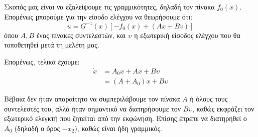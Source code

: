 \documentclass[11pt,a4paper,notitlepage,fleqn]{article}
\begin{document}
\begin{exercise}
	Σκοπός μας είναι να εξαλείψουμε τις γραμμικότητες, δηλαδή τον πίνακα
	\( f_0(x) \). Επομένως μπορούμε για την είσοδο ελέγχου να θεωρήσουμε
	ότι:
	\[
	u = G^{-1}(x)\left[
	-f_0(x) + (Ax+Bv)
	\right]
	\]
	όπου \( A,B \) ένας πίνακες συντελεστών, και \( \upsilon \) η
	εξωτερική είσοδος ελέγχου που θα τοποθετηθεί μετά τη μελέτη μας.

	Επομένως, τελικά έχουμε:
	\begin{align*}
		\dot x &= A_0 x + Ax + Bυ\\
		&= (A+A_0)x + Bυ
	\end{align*}

	Βέβαια δεν ήταν απαραίτητο να συμπεριλάβουμε τον πίνακα \( Α \) ή
	όλους τους συντελεστές του, αλλά ήταν σημαντικό να διατηρήσουμε
	τον \( Bυ \), καθώς εκφράζει τον εξωτερικό ελεγκτή που ζητείται από
	την εκφώνηση. Επίσης έπρεπε να διατηρηθεί ο \( A_0 \) (δηλαδή ο
	όρος \( -x_2 \)), καθώς είναι ήδη γραμμικός.
\end{exercise}
\end{document}
